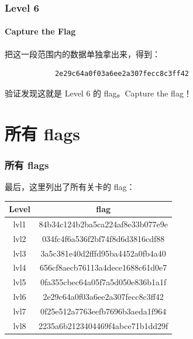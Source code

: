 \documentclass{ctexbeamer}
\begin{document}
    \begin{frame}[fragile]
        \frametitle{Level 6}
        \framesubtitle{Capture the Flag}
    
        把这一段范围内的数据单独拿出来，得到：\pause

        \begin{verbatim}
            2e29c64a0f03a6ee2a307fecc8c3ff42 
        \end{verbatim}

        \pause 验证发现这就是 Level 6 的 flag。Capture the flag！
    
    \end{frame}

    \section{所有 flags}

    \begin{frame}
        \frametitle{所有 flags}
    
        最后，这里列出了所有关卡的 flag：

        \begin{center}
            \ttfamily
            \begin{tabular}{cc}
                \hline
                Level & flag \\ \hline
                lvl1 & 84b34c124b2ba5ca224af8e33b077e9e \\
                lvl2 & 034fc4f6a536f2bf74f8d6d3816cdf88 \\
                lvl3 & 3a5c381e40d2fffd95ba4452a0fb4a40 \\
                lvl4 & 656cf8aecb76113a4dece1688c61d0e7 \\
                lvl5 & 0fa355cbec64a05f7a5d050e836b1a1f \\
                lvl6 & 2e29c64a0f03a6ee2a307fecc8c3ff42 \\
                lvl7 & 0f25e512a7763eefb7696b3aeda1f964 \\
                lvl8 & 2235a6b2123404469f4abce71b1dd29f \\ \hline
            \end{tabular}
        \end{center}
    
    \end{frame}
\end{document}
